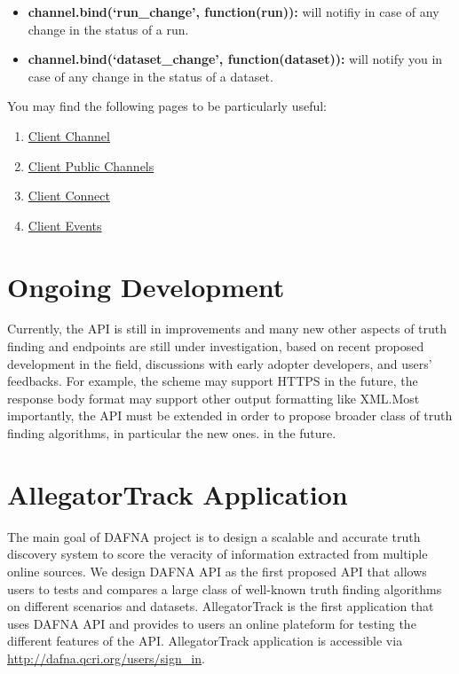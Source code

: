 \documentclass[a4paper,10pt]{scrartcl}
\begin{document}
\begin{itemize}
 \item \textbf{channel.bind(`run\_change', function(run){}):} will notifiy in case of any change in the status of a run.
 \item \textbf{channel.bind(`dataset\_change', function(dataset){}):} will notify you in case of any change in the status of a dataset. 
\end{itemize}
You may find the following pages to be particularly useful:
\begin{enumerate}
 \item \href{https://pusher.com/docs/client_api_guide/client_channels}{Client Channel}
 \item \href{https://pusher.com/docs/client_api_guide/client_public_channels}{Client Public Channels}
 \item \href{https://pusher.com/docs/client_api_guide/client_connect}{Client Connect}
 \item \href{https://pusher.com/docs/client_api_guide/client_events}{Client Events}
\end{enumerate}

\section{Ongoing Development}
Currently, the API is still in improvements and many new other aspects of truth finding and endpoints are still under investigation, based on recent
proposed development in the field, discussions with early adopter developers, and users' feedbacks. For example, the scheme may support HTTPS in the 
future, the response body format may support other output formatting like XML.Most importantly, the API must be extended in order to propose broader 
class of truth finding algorithms, in particular the new ones.
in the future.
\section{AllegatorTrack Application}
The main goal of DAFNA project is to design a scalable and accurate truth discovery system to score the veracity of information extracted from multiple 
online sources.  We design DAFNA API as the first proposed API that allows users to tests and compares a large class of well-known truth finding algorithms
on different scenarios and datasets. AllegatorTrack is the first application that uses DAFNA API and provides to users
an online plateform for testing the different features of the API. AllegatorTrack application is accessible via \href{http://dafna.qcri.org/users/sign\_in}{http://dafna.qcri.org/users/sign\_in}.
\end{document}
